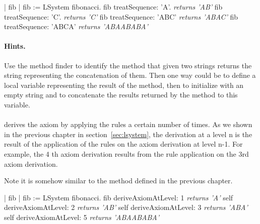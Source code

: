 \begin{scriptwithouttitle}
| fib |
fib := LSystem fibonacci.
fib treatSequence: 'A'.
\emph{returns 'AB'}
fib treatSequence: 'C'.
\emph{returns 'C'}
fib treatSequence: 'ABC'
\emph{returns 'ABAC'}
fib treatSequence: 'ABCA'
\emph{returns 'ABAABABA'}
\end{scriptwithouttitle}

\paragraph{Hints.} Use the method finder to identify the method that given 
two strings returns the string representing the concatenation of them.
Then one way could be to define a local variable representing the
result of the method, then to initialize with an empty
string and to concatenate the results returned by the method
 to this variable.


\paragraph{} derives the axiom by applying
the rules a certain number of times. As we shown in the previous
chapter in section~\ref{sec:lsystem}, the derivation at a level n is
the result of the application of the rules on the axiom derivation at
level n-1.  For example, the 4 th axiom derivation results from the
rule application on the 3rd axiom derivation.

Note it is somehow similar to the method
 defined in the
previous chapter.

\begin{scriptwithouttitle}
| fib |
fib := LSystem fibonacci. 
fib deriveAxiomAtLevel: 1
\emph{returns 'A'}
self deriveAxiomAtLevel: 2
\emph{returns 'AB'}
self deriveAxiomAtLevel: 3
\emph{returns 'ABA'}
self deriveAxiomAtLevel: 5
\emph{returns 'ABAABABA'}
\end{scriptwithouttitle}


